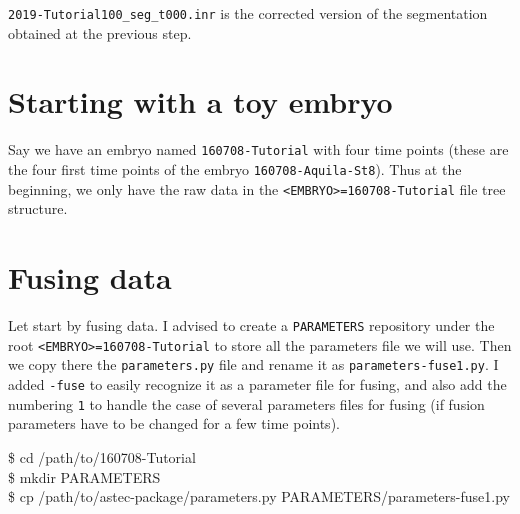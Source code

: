 \texttt{2019-Tutorial100\_seg\_t000.inr} is the corrected version of
the segmentation obtained at the previous step.













  

\pagebreak



\section{Starting with a toy embryo}

Say we have an embryo named \texttt{160708-Tutorial} with four time points (these are the four first time points of the embryo \texttt{160708-Aquila-St8}). Thus at the beginning, we only have the raw data in the \texttt{<EMBRYO>=160708-Tutorial} file tree structure.










\section{Fusing data}

Let start by fusing data. I advised to create a \texttt{PARAMETERS} repository under the root \texttt{<EMBRYO>=160708-Tutorial} to store all the parameters file we will use. Then we copy there the \texttt{parameters.py} file and rename it as \texttt{parameters-fuse1.py}. I added \texttt{-fuse} to easily recognize it as a parameter file for fusing, and also add the numbering \texttt{1} to handle the case of several parameters files for fusing (if fusion parameters have to be changed for a few time points).

\begin{code}{0.8}
\$ cd /path/to/160708-Tutorial\\
\$ mkdir PARAMETERS\\
\$ cp /path/to/astec-package/parameters.py  PARAMETERS/parameters-fuse1.py
\end{code}



